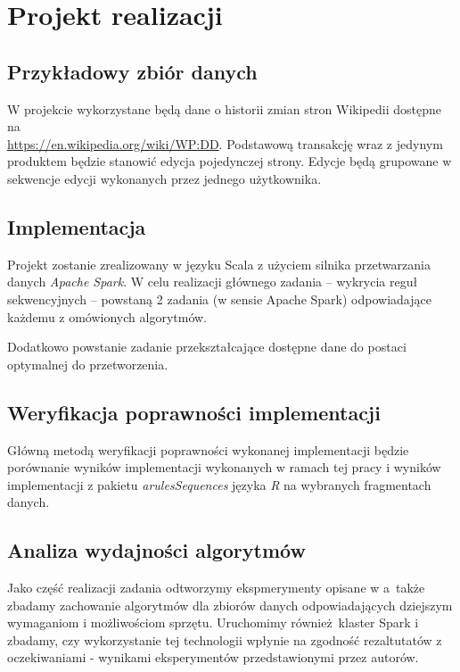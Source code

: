 \documentclass[paper=a4, fontsize=11pt]{scrartcl} %
\numberwithin{equation}{section} %
\numberwithin{figure}{section} %
\numberwithin{table}{section} %
\begin{document}
\section{Projekt realizacji}
\subsection{Przykładowy zbiór danych}
W projekcie wykorzystane będą dane o historii zmian stron Wikipedii dostępne na \\\hyperref[AA]{https://en.wikipedia.org/wiki/WP:DD}.
Podstawową transakcję wraz z jedynym produktem będzie stanowić edycja pojedynczej strony. Edycje będą grupowane w sekwencje edycji wykonanych przez jednego użytkownika.

\subsection{Implementacja}
Projekt zostanie zrealizowany w języku Scala z użyciem silnika przetwarzania danych \emph{Apache Spark}.
W celu realizacji głównego zadania -- wykrycia reguł sekwencyjnych -- powstaną 2 zadania (w sensie Apache Spark) odpowiadające każdemu z omówionych algorytmów.

Dodatkowo powstanie zadanie przekształcające dostępne dane do postaci optymalnej do przetworzenia.

\subsection{Weryfikacja poprawności implementacji}
Główną metodą weryfikacji poprawności wykonanej implementacji będzie porównanie wyników implementacji wykonanych w ramach tej pracy i wyników implementacji z pakietu \emph{arulesSequences} języka \emph{R} na wybranych fragmentach danych.

\subsection{Analiza wydajności algorytmów}
Jako część realizacji zadania odtworzymy ekspmerymenty opisane w \cite{spade}
a~także zbadamy zachowanie algorytmów dla zbiorów danych odpowiadających
dziejszym wymaganiom i możliwościom sprzętu.  Uruchomimy również klaster Spark
i zbadamy, czy wykorzystanie tej technologii wpłynie na zgodność rezaltutatów z
oczekiwaniami - wynikami eksperymentów przedstawionymi przez autorów.
\end{document}
